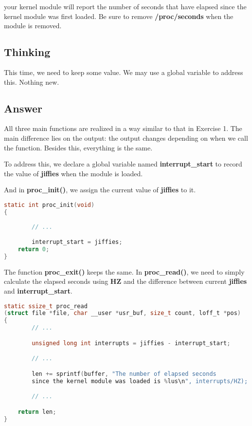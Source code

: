 \documentclass{article}
\begin{document}
    your kernel module will report the number of seconds that have elapsed since the kernel module was first loaded. Be sure to remove \textbf{/proc/seconds} when the module is removed.
    
    \subsection*{Thinking} This time, we need to keep some value. We may use a global variable to address this. Nothing new.
    
    \subsection*{Answer}
    All three main functions are realized in a way similar to that in Exercise 1. The main difference lies on the output: the output changes depending on when we call the function. Besides this, everything is the same. 

    To address this, we declare a global variable named \textbf{interrupt\_start} to record the value of \textbf{jiffies} when the module is loaded. 

    And in \textbf{proc\_init()}, we assign the current value of \textbf{jiffies} to it. 

    \vspace{2pt}

    \begin{lstlisting}[language=c, caption={\textbf{proc\_init()}}]
static int proc_init(void)
{
        
        // ...

        interrupt_start = jiffies;
	return 0;
}
    \end{lstlisting}

    \vspace{2pt}

    The function \textbf{proc\_exit()} keeps the same. In \textbf{proc\_read()}, we need to simply calculate the elapsed seconds using \textbf{HZ} and the difference between current \textbf{jiffies} and \textbf{interrupt\_start}.

    \vspace{2pt}

    \begin{lstlisting}[language=c, caption={\textbf{proc\_read()}}]
static ssize_t proc_read
(struct file *file, char __user *usr_buf, size_t count, loff_t *pos)
{
        // ...

        unsigned long int interrupts = jiffies - interrupt_start;

        // ...

        len += sprintf(buffer, "The number of elapsed seconds 
        since the kernel module was loaded is %lus\n", interrupts/HZ);

        // ...

	return len;
}
    \end{lstlisting}
\end{document}
